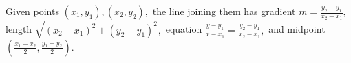 Given points $ (x_1 , y_1), (x_2, y_2) , $ the line joining them
has gradient $ m = \frac{y_2 - y_1}{x_2 - x_1} , $
length $ \sqrt{(x_2 - x_1)^2 + (y_2 - y_1)^2 } , $
equation $ \frac{y - y_1}{x - x_1} = \frac{y_2 - y_1}{x_2 - x_1} , $
and midpoint $ \left ( \frac{x_1 + x_2}{2} , \frac{y_1 + y_2}{2} \right ). $